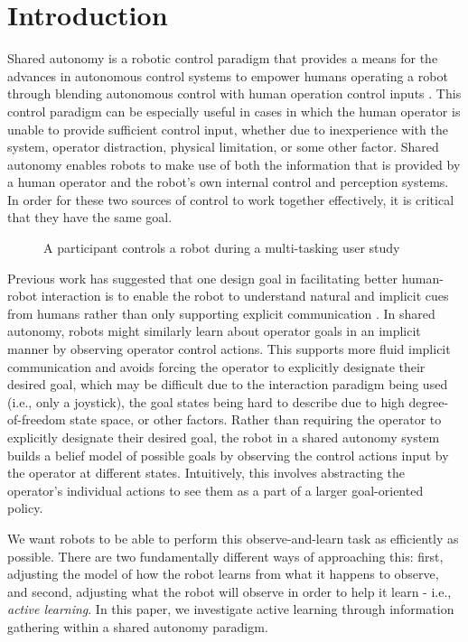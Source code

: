\documentclass[conference]{IEEEtran}
\begin{document}
\section{Introduction}

Shared autonomy is a robotic control paradigm that provides a means for the advances in autonomous control systems to empower humans operating a robot through blending autonomous control with human operation control inputs \cite{dragan2012formalizing, dragan2013policy, gopinath2017human}. This control paradigm can be especially useful in cases in which the human operator is unable to provide sufficient control input, whether due to inexperience with the system, operator distraction, physical limitation, or some other factor. Shared autonomy enables robots to make use of both the information that is provided by a human operator and the robot's own internal control and perception systems. In order for these two sources of control to work together effectively, it is critical that they have the same goal.

\begin{figure}
\caption{A participant controls a robot during a multi-tasking user study}
\label{teaser}
\end{figure}

Previous work has suggested that one design goal in facilitating better human-robot interaction is to enable the robot to understand natural and implicit cues from humans rather than only supporting explicit communication \cite{goodrich2003seven}. In shared autonomy, robots might similarly learn about operator goals in an implicit manner by observing operator control actions. This supports more fluid implicit communication and avoids forcing the operator to explicitly designate their desired goal, which may be difficult due to the interaction paradigm being used (i.e., only a joystick), the goal states being hard to describe due to high degree-of-freedom state space, or other factors. Rather than requiring the operator to explicitly designate their desired goal, the robot in a shared autonomy system builds a belief model of possible goals by observing the control actions input by the operator at different states. Intuitively, this involves abstracting the operator's individual actions to see them as a part of a larger goal-oriented policy.

We want robots to be able to perform this observe-and-learn task as efficiently as possible. There are two fundamentally different ways of approaching this: first, adjusting the model of how the robot learns from what it happens to observe, and second, adjusting what the robot will observe in order to help it learn - i.e., \textit{active learning}. In this paper, we investigate active learning through information gathering within a shared autonomy paradigm.
\end{document}

